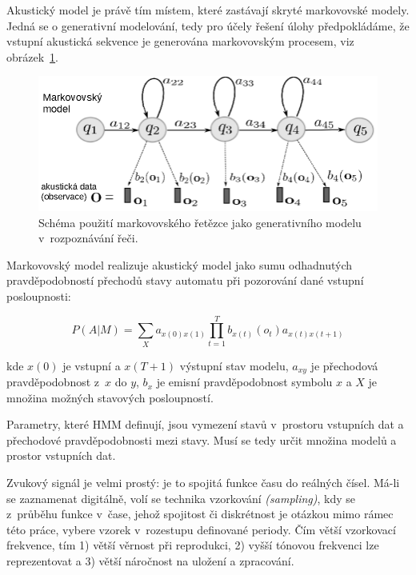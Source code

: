 Akustický model je právě tím místem, které zastávají skryté markovovské modely.
Jedná se o generativní modelování, tedy pro účely řešení úlohy předpokládáme, že
vstupní akustická sekvence je generována markovovským procesem, viz
obrázek~\ref{fig:hmm}.

\begin{figure}[htpb]
\includegraphics[scale=0.48]{rc/hmm.png}
\caption{
    Schéma použití markovovského řetězce jako generativního modelu
    v~rozpoznávání řeči.
}
\label{fig:hmm}
\end{figure}

Markovovský model realizuje akustický model jako sumu odhadnutých
pravděpodobností přechodů stavy automatu při pozorování dané vstupní
posloupnosti:

\begin{equation}
P(A|M) = \sum_X a_{x(0)x(1)} \prod_{t=1}^T b_{x(t)}(o_t)a_{x(t)x(t+1)}
\end{equation}

kde $x(0)$ je vstupní a $x(T + 1)$ výstupní stav modelu, $a_{xy}$ je přechodová
pravděpodobnost z~$x$ do $y$, $b_{x}$ je emisní pravděpodobnost symbolu $x$ a
$X$ je množina možných stavových posloupností.

Parametry, které HMM definují, jsou vymezení stavů v~prostoru vstupních dat a
přechodové pravděpodobnosti mezi stavy. Musí se tedy určit množina modelů a
prostor vstupních dat.


Zvukový signál je velmi prostý: je to spojitá funkce času do reálných čísel.
Má-li se zaznamenat digitálně, volí se technika vzorkování \textit{(sampling)},
kdy se z~průběhu funkce v~čase, jehož spojitost či diskrétnost je otázkou mimo
rámec této práce, vybere vzorek v~rozestupu definované periody. Čím větší
vzorkovací frekvence, tím 1) větší věrnost při reprodukci, 2) vyšší tónovou
frekvenci lze reprezentovat a 3) větší náročnost na uložení a zpracování.

